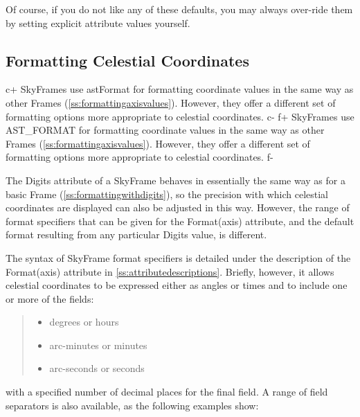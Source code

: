 \documentclass[twoside,11pt]{article}
\newcommand{\appref}[1]{Appendix~\ref{#1}}
\newcommand{\secref}[1]{\S\ref{#1}}
\renewcommand{\appref}[1]{\ref{#1}}
\renewcommand{\secref}[1]{\ref{#1}}
\begin{document}
Of course, if you do not like any of these defaults, you may always
over-ride them by setting explicit attribute values yourself.

\subsection{\label{ss:formattingskyaxisvalues}Formatting Celestial Coordinates}

c+
SkyFrames use astFormat for formatting coordinate values in the same
way as other Frames (\secref{ss:formattingaxisvalues}). However, they
offer a different set of formatting options more appropriate to
celestial coordinates.
c-
f+
SkyFrames use AST\_FORMAT for formatting coordinate values in the same
way as other Frames (\secref{ss:formattingaxisvalues}). However, they
offer a different set of formatting options more appropriate to
celestial coordinates.
f-

The Digits attribute of a SkyFrame behaves in essentially the same way
as for a basic Frame (\secref{ss:formattingwithdigits}), so the
precision with which celestial coordinates are displayed can also be
adjusted in this way. However, the range of format specifiers that can
be given for the Format(axis) attribute, and the default format
resulting from any particular Digits value, is different.

The syntax of SkyFrame format specifiers is detailed under the
description of the Format(axis) attribute in
\appref{ss:attributedescriptions}.  Briefly, however, it allows
celestial coordinates to be expressed either as angles or times and to
include one or more of the fields:

\begin{quote}
\begin{itemize}
\item degrees or hours
\item arc-minutes or minutes
\item arc-seconds or seconds
\end{itemize}
\end{quote}

with a specified number of decimal places for the final field. A range
of field separators is also available, as the following examples show:
\end{document}
